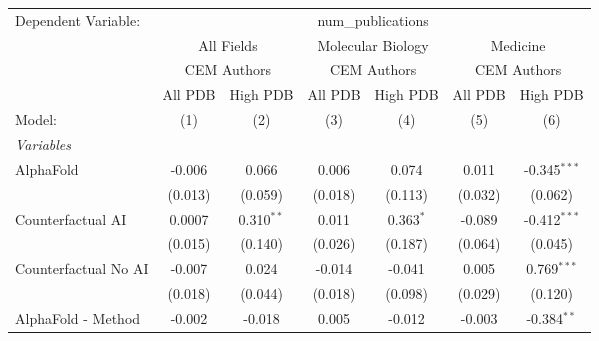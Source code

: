 \begingroup
\centering
\begin{tabular}{lcccccc}
   \tabularnewline \midrule \midrule
   Dependent Variable: & \multicolumn{6}{c}{num\_publications}\\
 & \multicolumn{2}{c}{All Fields} & \multicolumn{2}{c}{Molecular Biology} & \multicolumn{2}{c}{Medicine} \\
\cmidrule(lr){2-3} \cmidrule(lr){4-5} \cmidrule(lr){6-7}
 & \multicolumn{2}{c}{CEM Authors} & \multicolumn{2}{c}{CEM Authors} & \multicolumn{2}{c}{CEM Authors} \\
\cmidrule(lr){2-3} \cmidrule(lr){4-5} \cmidrule(lr){6-7}
 & \multicolumn{1}{c}{All PDB} & \multicolumn{1}{c}{High PDB} & \multicolumn{1}{c}{All PDB} & \multicolumn{1}{c}{High PDB} & \multicolumn{1}{c}{All PDB} & \multicolumn{1}{c}{High PDB} \\
\cmidrule(lr){2-2} \cmidrule(lr){3-3} \cmidrule(lr){4-4} \cmidrule(lr){5-5} \cmidrule(lr){6-6} \cmidrule(lr){7-7}
   Model:                                                     & (1)           & (2)           & (3)     & (4)            & (5)          & (6)\\  
   \midrule
   \emph{Variables}\\
   AlphaFold                                                  & -0.006        & 0.066         & 0.006   & 0.074          & 0.011        & -0.345$^{***}$\\   
                                                              & (0.013)       & (0.059)       & (0.018) & (0.113)        & (0.032)      & (0.062)\\   
   Counterfactual AI                                          & 0.0007        & 0.310$^{**}$  & 0.011   & 0.363$^{*}$    & -0.089       & -0.412$^{***}$\\   
                                                              & (0.015)       & (0.140)       & (0.026) & (0.187)        & (0.064)      & (0.045)\\   
   Counterfactual No AI                                       & -0.007        & 0.024         & -0.014  & -0.041         & 0.005        & 0.769$^{***}$\\   
                                                              & (0.018)       & (0.044)       & (0.018) & (0.098)        & (0.029)      & (0.120)\\   
   AlphaFold - Method                                         & -0.002        & -0.018        & 0.005   & -0.012         & -0.003       & -0.384$^{**}$\\   

\end{tabular}
